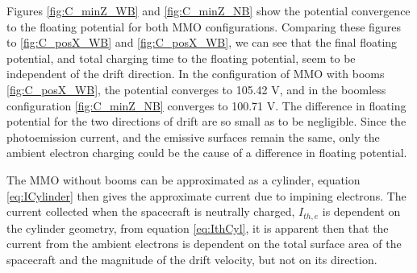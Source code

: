 Figures \ref{fig:C_minZ_WB} and \ref{fig:C_minZ_NB} show the potential convergence to the floating potential for both MMO configurations. Comparing these figures to \ref{fig:C_posX_WB} and \ref{fig:C_posX_WB}, we can see that the final floating potential, and total charging time to the floating potential, seem to be independent of the drift direction. In the configuration of MMO with booms \ref{fig:C_posX_WB}, the potential converges to 105.42 V, and in the boomless configuration \ref{fig:C_minZ_NB} converges to 100.71 V. The difference in floating potential for the two directions of drift are so small as to be negligible. Since the photoemission current, and the emissive surfaces remain the same, only the ambient electron charging could be the cause of a difference in floating potential. 

The MMO without booms can be approximated as a cylinder, equation \eqref{eq:ICylinder} then gives the approximate current due to impining electrons. The current collected when the spacecraft is neutrally charged, $I_{th,e}$ is dependent on the cylinder geometry, from equation \eqref{eq:IthCyl}, it is apparent then that the current from the ambient electrons is dependent on the total surface area of the spacecraft and the magnitude of the drift velocity, but not on its direction.

